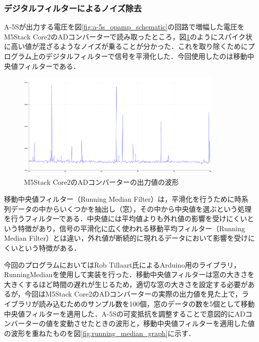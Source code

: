 \subsubsection{デジタルフィルターによるノイズ除去}

A-5Sが出力する電圧を図\ref{fig:a-5s_opamp_schematic}の回路で増幅した電圧をM5Stack Core2のADコンバーターで読み取ったところ，図\ref{fig:m5core2_adc_raw}のようにスパイク状に高い値が混ざるようなノイズが乗ることが分かった．これを取り除くためにプログラム上のデジタルフィルターで信号を平滑化した．今回使用したのは移動中央値フィルターである．

\begin{figure}[H]
  \begin{center}
    \includegraphics[width=10cm]{fig/m5core2_adc_raw}
    \caption{M5Stack Core2のADコンバーターの出力値の波形}
    \label{fig:m5core2_adc_raw}
  \end{center}
\end{figure}

移動中央値フィルター（Running Median Filter）は，平滑化を行うために時系列データの中からいくつかを抽出し（窓），その中から中央値を選ぶという処理を行うフィルターである．中央値には平均値よりも外れ値の影響を受けにくいという特徴があり，信号の平滑化に広く使われる移動平均フィルター（Running Median Filter）とは違い，外れ値が断続的に現れるデータにおいて影響を受けにくいという特徴がある．

今回のプログラムにおいてはRob Tillaart氏によるArduino用のライブラリ，RunningMedian\cite{tillaart_2021}を使用して実装を行った．移動中央値フィルターは窓の大きさを大きくするほど時間の遅れが生じるため，適切な窓の大きさを設定する必要があるが，今回はM5Stack Core2のADコンバーターの実際の出力値を見た上で，ライブラリが読み込むためのサンプル数を100個，窓のデータの数を5個として移動中央値フィルターを適用した．A-5Sの可変抵抗を調整することで意図的にADコンバーターの値を変動させたときの波形と，移動中央値フィルターを適用した値の波形を重ねたものを図\ref{fig:running_median_graph}に示す．


